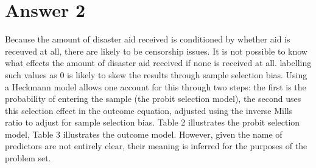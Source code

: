 \documentclass[12pt,letterpaper]{article}
\begin{document}
	\newpage
	
	\section*{Answer 2}
	\vspace{.25cm}
	
	Because the amount of disaster aid received is conditioned by whether aid is receuved at all, there are likely to be censorship issues. It is not possible to know what effects the amount of disaster aid received if none is received at all. labelling such values as 0 is likely to skew the results through sample selection bias. Using a Heckmann model allows one account for this through two steps: the first is the probability of entering the sample (the probit selection model), the second uses this selection effect in the outcome equation, adjusted using the inverse Mills ratio to adjust for sample selection bias. Table 2 illustrates the probit selection model,  Table 3 illustrates the outcome model. However, given the name of predictors are not entirely clear, their meaning is inferred for the purposes of the problem set.
	
	
	
\end{document}
